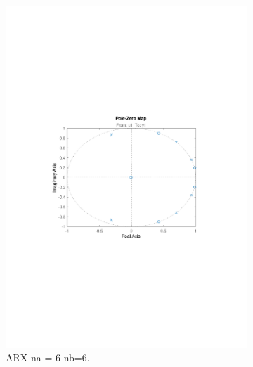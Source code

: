 \documentclass[]{article}
\begin{document}
\begin{figure}[ht]
\centering
\begin{subfigure}{.49\textwidth}
	\centering
	\includegraphics[trim= 10cm 8cm 10cm 8cm, scale=0.4]{figures/pz_arx_66.pdf}
	\caption{ARX na = 6 nb=6.}
	\label{fig:pzplot_arx1}
\end{subfigure}
\begin{subfigure}{.49\textwidth}
	\centering

\end{subfigure}
\end{figure}
\end{document}
